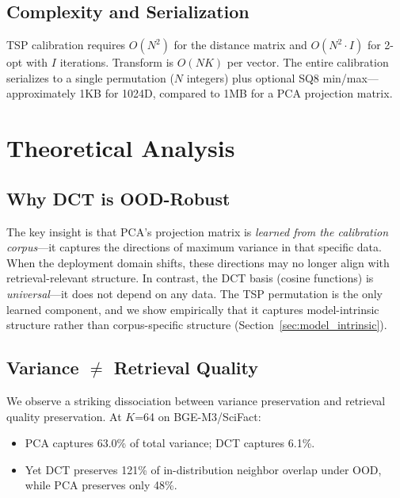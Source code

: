 \documentclass[sigconf]{acmart}
\begin{document}
\subsection{Complexity and Serialization}\label{sec:complexity}

TSP calibration requires $O(N^2)$ for the distance matrix and $O(N^2 \cdot I)$ for 2-opt with $I$ iterations. Transform is $O(NK)$ per vector. The entire calibration serializes to a single permutation ($N$ integers) plus optional SQ8 min/max---approximately 1KB for 1024D, compared to 1MB for a PCA projection matrix.

\section{Theoretical Analysis}\label{sec:theory}

\subsection{Why DCT is OOD-Robust}\label{sec:ood_robust}

The key insight is that PCA's projection matrix is \emph{learned from the calibration corpus}---it captures the directions of maximum variance in that specific data. When the deployment domain shifts, these directions may no longer align with retrieval-relevant structure. In contrast, the DCT basis (cosine functions) is \emph{universal}---it does not depend on any data. The TSP permutation is the only learned component, and we show empirically that it captures model-intrinsic structure rather than corpus-specific structure (Section~\ref{sec:model_intrinsic}).

\subsection{Variance $\neq$ Retrieval Quality}\label{sec:variance_neq_retrieval}

We observe a striking dissociation between variance preservation and retrieval quality preservation. At $K$=64 on BGE-M3/SciFact:

\begin{itemize}
    \item PCA captures 63.0\% of total variance; DCT captures 6.1\%.
    \item Yet DCT preserves 121\% of in-distribution neighbor overlap under OOD, while PCA preserves only 48\%.
\end{itemize}
\end{document}
